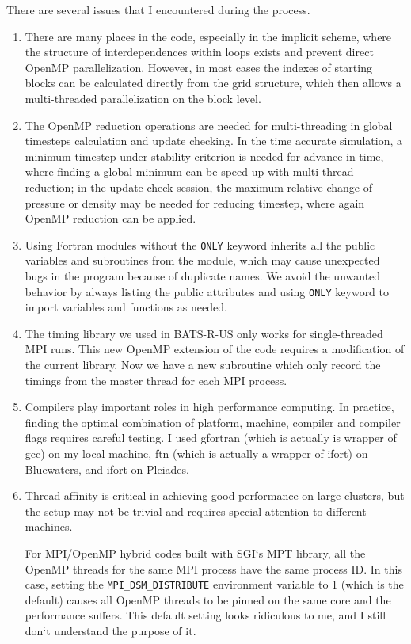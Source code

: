 \documentclass[fleqn,11pt]{SelfArx} %
\begin{document}
There are several issues that I encountered during the process.
\begin{enumerate}
\item There are many places in the code, especially in the implicit scheme, where the structure of interdependences within loops exists and prevent direct OpenMP parallelization. However, in most cases the indexes of starting blocks can be calculated directly from the grid structure, which then allows a multi-threaded parallelization on the block level.
\item The OpenMP reduction operations are needed for multi-threading in global timesteps calculation and update checking. In the time accurate simulation, a minimum timestep under stability criterion is needed for advance in time, where finding a global minimum can be speed up with multi-thread reduction; in the update check session, the maximum relative change of pressure or density may be needed for reducing timestep, where again OpenMP reduction can be applied.
\item Using Fortran modules without the \verb|ONLY| keyword inherits all the public variables and subroutines from the module, which may cause unexpected bugs in the program because of duplicate names. We avoid the unwanted behavior by always listing the public attributes and using \verb|ONLY| keyword to import variables and functions as needed.
\item The timing library we used in BATS-R-US only works for single-threaded MPI runs. This new OpenMP extension of the code requires a modification of the current library. Now we have a new subroutine which only record the timings from the master thread for each MPI process.

\item Compilers play important roles in high performance computing. In practice, finding the optimal combination of platform, machine, compiler and compiler flags requires careful testing. I used gfortran (which is actually is wrapper of gcc) on my local machine, ftn (which is actually a wrapper of ifort) on Bluewaters, and ifort on Pleiades.

\item Thread affinity is critical in achieving good performance on large clusters, but the setup may not be trivial and requires special attention to different machines.

For MPI/OpenMP hybrid codes built with SGI`s MPT library, all the OpenMP threads for the same MPI process have the same process ID. In this case, setting the \verb|MPI_DSM_DISTRIBUTE| environment variable to 1 (which is the default) causes all OpenMP threads to be pinned on the same core and the performance suffers. This default setting looks ridiculous to me, and I still don`t understand the purpose of it.


\end{enumerate}
\end{document}
